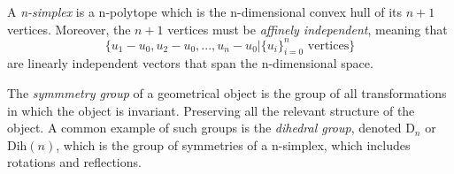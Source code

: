 \documentclass{article}
\begin{document}
\begin{definition}
  A \textit{n-simplex} is a n-polytope which is the n-dimensional convex hull of its $n+1$ vertices. Moreover, the $n+1$ vertices must be \textit{affinely independent}, meaning that
  \[ \{u_1 - u_0, u_2 - u_0, ..., u_n - u_0 | \{u_i\}_{i=0}^{n} \text{ vertices} \} \]
  are linearly independent vectors that span the n-dimensional space. 
\end{definition}

\begin{definition}
  The \textit{symmmetry group} of a geometrical object is the group of all transformations in which the object is invariant. Preserving all the relevant structure of the object. A common example of such groups is the \textit{dihedral group}, denoted D$_{n}$ or Dih$(n)$, which is the group of symmetries of a n-simplex, which includes rotations and reflections. 
\end{definition}
\end{document}
